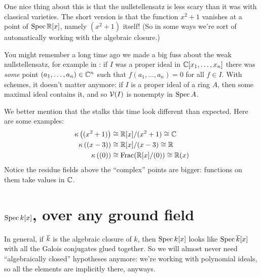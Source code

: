 One nice thing about this is that the nullstellensatz
is less scary than it was with classical varieties.
The short version is that the function $x^2+1$
vanishes at a point of $\operatorname{Spec} \mathbb R[x]$, namely $(x^2+1)$ itself!
(So in some ways we're sort of automatically working
with the algebraic closure.)

You might remember a long time ago we made a big fuss about
the weak nullstellensatz, for example in
:
if $I$ was a proper ideal in $\mathbb C[x_1, \dots, x_n]$
there was \emph{some} point $(a_1, \dots, a_n) \in \mathbb C^n$
such that $f(a_1, \dots, a_n) = 0$ for all $f \in I$.
With schemes, it doesn't matter anymore:
if $I$ is a proper ideal of a ring $A$,
then some maximal ideal contains it,
and so $\mathcal V(I)$ is nonempty in $\operatorname{Spec} A$.

We better mention that the stalks this time look different than expected.
Here are some examples:
\begin{align*}
	\kappa\left( (x^2+1) \right) &\cong \mathbb R[x]/(x^2+1) \cong \mathbb C \\
	\kappa \left( (x-3) \right) &\cong \mathbb R[x] / (x-3) \cong \mathbb R \\
	\kappa \left( (0) \right) &\cong \operatorname{Frac}(\mathbb R[x] / (0)) \cong \mathbb R(x)
\end{align*}
Notice the residue fields above the ``complex''
points are bigger: functions on them take values in $\mathbb C$.


\section{$\operatorname{Spec} k[x]$, over any ground field}
In general, if $\overline k$ is the algebraic closure of $k$,
then $\operatorname{Spec} k[x]$ looks like $\operatorname{Spec} \overline k[x]$
with all the Galois conjugates glued together.
So we will almost never need ``algebraically closed''
hypotheses anymore: we're working with polynomial ideals,
so all the elements are implicitly there, anyways.


